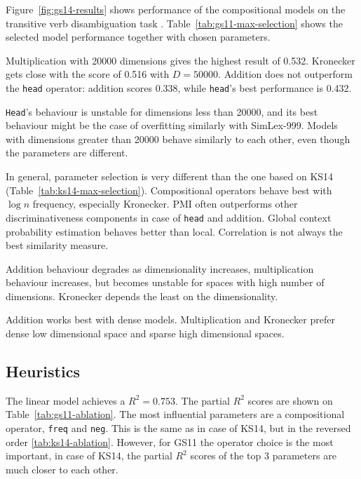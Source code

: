 

Figure~\ref{fig:gs14-results} shows performance of the compositional models on the transitive verb disambiguation task \cite{Grefenstette:2011:ESC:2145432.2145580}. Table~\ref{tab:gs11-max-selection} shows the selected model performance together with chosen parameters.

Multiplication with 20000 dimensions gives the highest result of 0.532. Kronecker gets close with the score of 0.516 with $D = 50000$. Addition does not outperform the \texttt{head} operator: addition scores 0.338, while \texttt{head}'s best performance is 0.432.

\texttt{Head}'s behaviour is unstable for dimensions less than 20000, and its best behaviour might be the case of overfitting similarly with SimLex-999. Models with dimensions greater than 20000 behave similarly to each other, even though the parameters are different.

In general, parameter selection is very different than the one based on KS14 (Table~\ref{tab:ks14-max-selection}). Compositional operators behave best with $\log n$ frequency, especially Kronecker. PMI often outperforms other discriminativeness components in case of \texttt{head} and addition. Global context probability estimation behaves better than local. Correlation is not always the best similarity measure.

Addition behaviour degrades as dimensionality increases, multiplication behaviour increases, but becomes unstable for spaces with high number of dimensions. Kronecker depends the least on the dimensionality.

Addition works best with dense models. Multiplication and Kronecker prefer dense low dimensional space and sparse high dimensional spaces.


\subsection{Heuristics}
\label{sec:heuristics-gs11}

The linear model achieves a $R^2 = 0.753$. The partial $R^2$ scores are shown on Table~\ref{tab:gs11-ablation}. The most influential parameters are a compositional operator, \texttt{freq} and \texttt{neg}. This is the same as in case of KS14, but in the reversed order \ref{tab:ks14-ablation}. However, for GS11 the operator choice is the most important, in case of KS14, the partial $R^2$ scores of the top 3 parameters are much closer to each other.

